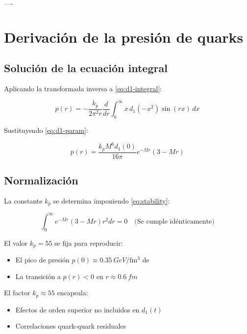 ----
\section{Derivación de la presión de quarks}\label{app:quark-pressure}

\subsection{Solución de la ecuación integral}
Aplicando la transformada inversa a \eqref{eq:d1-integral}:

\begin{equation}
p(r) = -\frac{k_p}{2\pi^2 r}\frac{d}{dr}\int_0^\infty x\,d_1(-x^2)\sin(rx)\,dx
\end{equation}

Sustituyendo \eqref{eq:d1-param}:

\begin{equation}
p(r) = \frac{k_p M^6 d_1(0)}{16\pi} e^{-Mr}\left(3 - Mr\right)
\end{equation}

\subsection{Normalización}
La constante $k_p$ se determina imponiendo \eqref{eq:stability}:

\begin{equation}
\int_0^\infty e^{-Mr}(3 - Mr)r^2 dr = 0 \quad \text{(Se cumple idénticamente)}
\end{equation}

El valor $k_p = 55$ se fija para reproducir:
\begin{itemize}
    \item El pico de presión $p(0) \approx \qty{0.35}{GeV/\femto\meter\cubed}$ de \cite{Burkert_2018}
    \item La transición a $p(r) < 0$ en $r \approx \qty{0.6}{fm}$
\end{itemize}

El factor $k_p \approx 55$ encapsula:
\begin{itemize}
    \item Efectos de orden superior no incluidos en $d_1(t)$
    \item Correlaciones quark-quark residuales
\end{itemize}